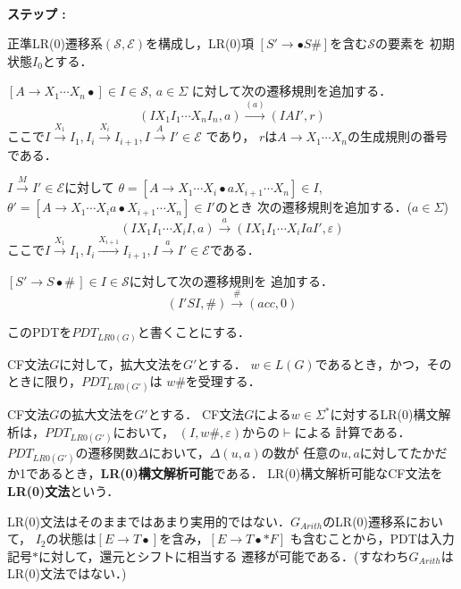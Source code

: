 \documentclass[a4j,dvipdfmx]{jbook}
\begin{document}
\begin{Alg}\label{PDTLR0}\ 
\begin{list}{{\rm\bf ステップ :}}{}
  \item 正準LR(0)遷移系$(\mathcal{S},\mathcal{E})$を構成し，LR(0)項
  $[S'\rightarrow\bullet S\texttt{\#}]$を含む$\mathcal{S}$の要素を
  初期状態$I_0$とする．
  \item $[A\rightarrow X_1\cdots X_n\bullet]\in I\in\mathcal{S}$, $a\in\Sigma$
  に対して次の遷移規則を追加する．
  \[(IX_1I_1\cdots X_nI_n,a)\xrightarrow{(a)}(IAI',r)\]
  ここで$I\xrightarrow{X_1}I_1,I_i\xrightarrow{X_i}I_{i+1},I\xrightarrow{A}I'\in\mathcal{E}$
  であり，
  $r$は$A\rightarrow X_1\cdots X_n$の生成規則の番号である．
  \item $I\xrightarrow{M}I'\in\mathcal{E}$に対して 
  $\theta=[A\rightarrow X_1\cdots X_i\bullet a X_{i+1}\cdots X_n]\in I$,
  $\theta'=[A\rightarrow X_1\cdots X_i a\bullet X_{i+1}\cdots X_n]\in I'$のとき
  次の遷移規則を追加する．($a\in\Sigma$)
  \[(IX_1I_1\cdots X_iI,a)\xrightarrow{a}(IX_1I_1\cdots X_iIaI',\varepsilon)\]
  ここで$I\xrightarrow{X_1}I_1,I_i\xrightarrow{X_{i+1}}I_{i+1},I\xrightarrow{a}I'\in\mathcal{E}$である．
  \item $[S'\rightarrow S\bullet\texttt{\#}\,]\in I\in\mathcal{S}$に対して次の遷移規則を
  追加する．
  \[(I'SI,\texttt{\#})\xrightarrow{\texttt{\#}}(acc,0)\]
\end{list}
\end{Alg}

このPDTを$PDT_{LR0(G)}$と書くことにする．
\begin{Prop}
  CF文法$G$に対して，拡大文法を$G'$とする．
  $w\in L(G)$であるとき，かつ，そのときに限り，$PDT_{LR0(G')}$は
  $w\texttt{\#}$を受理する．
\end{Prop}

\begin{Def}
  CF文法$G$の拡大文法を$G'$とする．
  CF文法$G$による$w\in\Sigma^\ast$に対するLR(0)構文解析は，$PDT_{LR0(G')}$において，
  $(I,w\texttt{\#},\varepsilon)$からの$\vdash$による
  計算である．
  $PDT_{LR0(G')}$の遷移関数$\Delta$において，$\Delta(u,a)$の数が
  任意の$u,a$に対してたかだか1であるとき，{\bf LR(0)構文解析可能}である．
  LR(0)構文解析可能なCF文法を{\bf LR(0)文法}という．
\end{Def}

LR(0)文法はそのままではあまり実用的ではない．$G_{Arith}$のLR(0)遷移系において，
$I_2$の状態は$[E\rightarrow T\bullet]$を含み，$[E\rightarrow T\bullet\texttt{*}F]$
も含むことから，PDTは入力記号$\texttt{*}$に対して，還元とシフトに相当する
遷移が可能である．(すなわち$G_{Arith}$はLR(0)文法ではない．)
\end{document}
